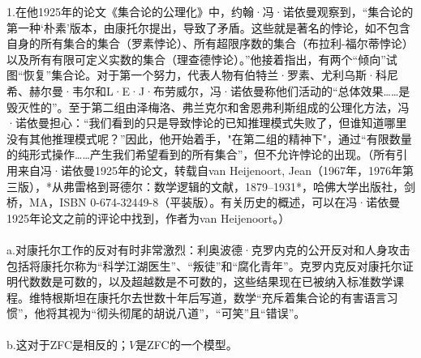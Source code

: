 1.在他1925年的论文《集合论的公理化》中，约翰·冯·诺依曼观察到，“集合论的第一种‘朴素’版本，由康托尔提出，导致了矛盾。这些就是著名的悖论，如不包含自身的所有集合的集合（罗素悖论）、所有超限序数的集合（布拉利-福尔蒂悖论）以及所有有限可定义实数的集合（理查德悖论）。”他接着指出，有两个“倾向”试图“恢复”集合论。对于第一个努力，代表人物有伯特兰·罗素、尤利乌斯·科尼希、赫尔曼·韦尔和L·E·J·布劳威尔，冯·诺依曼称他们活动的“总体效果……是毁灭性的”。至于第二组由泽梅洛、弗兰克尔和舍恩弗利斯组成的公理化方法，冯·诺依曼担心：“我们看到的只是导致悖论的已知推理模式失败了，但谁知道哪里没有其他推理模式呢？”因此，他开始着手，"在第二组的精神下"，通过“有限数量的纯形式操作……产生我们希望看到的所有集合”，但不允许悖论的出现。（所有引用来自冯·诺依曼1925年的论文，转载自van Heijenoort, Jean（1967年，1976年第三版），*从弗雷格到哥德尔：数学逻辑的文献，1879–1931*，哈佛大学出版社，剑桥，MA，ISBN 0-674-32449-8（平装版）。有关历史的概述，可以在冯·诺依曼1925年论文之前的评论中找到，作者为van Heijenoort。）\\\\
a.对康托尔工作的反对有时非常激烈：利奥波德·克罗内克的公开反对和人身攻击包括将康托尔称为“科学江湖医生”、“叛徒”和“腐化青年”。克罗内克反对康托尔证明代数数是可数的，以及超越数是不可数的，这些结果现在已被纳入标准数学课程。维特根斯坦在康托尔去世数十年后写道，数学“充斥着集合论的有害语言习惯”，他将其视为“彻头彻尾的胡说八道”，“可笑”且“错误”。\\\\
b.这对于ZFC是相反的；$V$是ZFC的一个模型。
